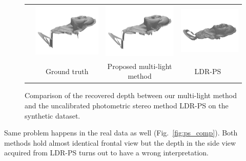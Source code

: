 \begin{figure}[H]
{\begin{tabular}{c c c c}
   \multirow{-6}{*}{\parbox[t]{2.5mm}{}} &    
   \includegraphics[height = 0.22\linewidth]{figures/result/ps2_gt.pdf} 
   &
   \includegraphics[height = 0.22\linewidth]{figures/result/ps2_robust.pdf} &
   \includegraphics[height = 0.22\linewidth]{figures/result/ps2_LDR.pdf} \\

  {} & {Ground truth} & {Proposed multi-light method}  & {LDR-PS~\cite{favaro2012closed}}
 \end{tabular}}
\caption{Comparison of the recovered depth between our multi-light method and the uncalibrated photometric stereo method LDR-PS on the synthetic dataset.}
\label{fig:ps_comp_syn}
\end{figure}


Same problem happens in the real data as well (Fig.~\ref{fig:ps_comp}). 
Both methods hold almost identical frontal view but the depth in the side view acquired from LDR-PS turns out to have a wrong interpretation. 


